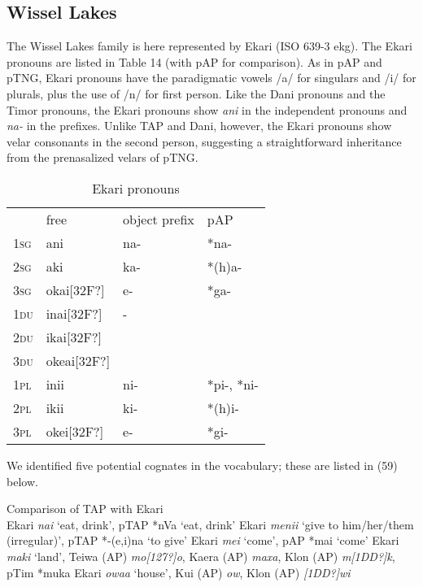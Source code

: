 \subsection{Wissel Lakes}
The Wissel Lakes family is here represented by Ekari (ISO 639-3 ekg). The Ekari pronouns are listed in Table 14 (with pAP for comparison). As in pAP and pTNG, Ekari pronouns have the paradigmatic vowels /a/ for singulars and /i/ for plurals, plus the use of /n/ for first person. Like the Dani pronouns and the Timor pronouns, the Ekari pronouns show \textit{ani} in the independent pronouns and \textit{na-} in the prefixes. Unlike TAP and Dani, however, the Ekari pronouns show velar consonants in the second person, suggesting a straightforward inheritance from the prenasalized velars of pTNG.



\begin{table}\centering


\begin{tabular}{llll}&free&object prefix& pAP \\
\textsc{1sg}& ani & na- & *na- \\
\textsc{2sg}& aki & ka- & *(h)a- \\
\textsc{3sg}& okai[32F?] & e- & *ga- \\
\textsc{1du}& inai[32F?] & - &\\
\textsc{2du}& ikai[32F?] &&\\
\textsc{3du}& okeai[32F?] &&\\
\textsc{1pl}& inii & ni- & *pi-, *ni- \\
\textsc{2pl}& ikii & ki- & *(h)i- \\
\textsc{3pl}& okei[32F?] & e- & *gi- \\

\end{tabular}

\caption{Ekari pronouns \citep{Drabbe1952}}\end{table}
We identified five potential cognates in the vocabulary; these are listed in (59) below.

\ea%
  Comparison of TAP with Ekari \citep{Steltenpool1969} \\
  \ea  Ekari \textit{nai} `eat, drink', pTAP *nVa `eat, drink'
  \ex Ekari \textit{menii} `give to him/her/them (irregular)', pTAP *-(e,i)na `to give'
  \ex Ekari \textit{mei} `come', pAP *mai `come'
  \ex Ekari \textit{maki} `land', Teiwa (AP) \textit{mo[127?]o}\textit{{\textglotstop}}, Kaera (AP) \textit{maxa}, Klon (AP) \textit{m}\textit{[1DD?]}\textit{k}\textit{{\textepsilon}{\textglotstop}}, pTim *muka
  \ex Ekari \textit{owaa} `house', Kui (AP) \textit{ow}, Klon (AP) \textit{[1DD?]}\textit{wi}
  \z
\z



